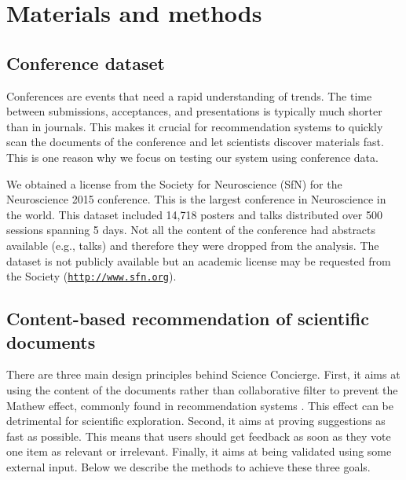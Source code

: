 \documentclass[a4paper]{article}
\begin{document}
\section{Materials and methods}

\subsection{Conference dataset}

Conferences are events that need a rapid understanding of trends. The time between submissions, acceptances, and presentations is typically much shorter than in journals. This makes it crucial for recommendation systems to quickly scan the documents of the conference and let scientists discover materials fast. This is one reason why we focus on testing our system using conference data.


We obtained a license from the Society for Neuroscience (SfN) for the Neuroscience 2015 conference. This is the largest conference in Neuroscience in the world. This dataset included 14,718 posters and talks distributed over 500 sessions spanning 5 days. Not all the content of the conference had abstracts available (e.g., talks) and therefore they were dropped from the analysis. The dataset is not publicly available but an academic license may be requested from the Society (\href{https://www.sfn.org}{\texttt{http://www.sfn.org}}).


\subsection{Content-based recommendation of scientific documents}


There are three main design principles behind Science Concierge. First, it aims at using the content of the documents rather than collaborative filter to prevent the Mathew effect, commonly found in recommendation systems  \cite{petersen2011quantitative}. This effect can be detrimental for scientific exploration. Second, it aims at proving suggestions as fast as possible. This means that users should get feedback as soon as they vote one item as relevant or irrelevant. Finally, it aims at being validated using some external input. Below we describe the methods to achieve these three goals.
\end{document}
